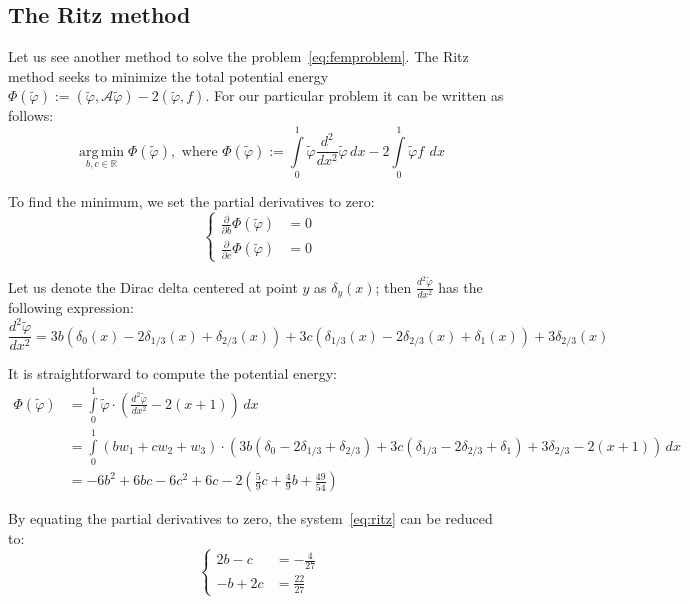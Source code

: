 \documentclass[notitlepage,oneside]{book}
\DeclareMathOperator*{\argmin}{arg\,min}
\begin{document}
\subsection{The Ritz method}
Let us see another method to solve the problem~\eqref{eq:femproblem}. 
The Ritz method seeks to minimize the total potential energy $\Phi(\tilde\varphi) := ( \tilde\varphi, \mathcal A \tilde\varphi) - 2 (\tilde\varphi, f)$.
For our particular problem it can be written as follows:
\begin{equation}
\label{eq:ritz}
\argmin\limits_{b,c\in \mathbb R} \Phi(\tilde\varphi), \text{~where~} \Phi(\tilde\varphi) :=  \int\limits_0^1 \tilde\varphi \frac{d^2}{dx^2}\tilde{\varphi}\, dx -2 \int\limits_0^1 \tilde\varphi f\ \, dx 
\end{equation}

To find the minimum, we set the partial derivatives to zero:
\begin{equation}
\label{eq:ritz}
\left\{
\begin{split}
\frac{\partial}{\partial b} \Phi(\tilde\varphi) & = 0 \\
\frac{\partial}{\partial c} \Phi(\tilde\varphi) & = 0
\end{split}
\right.
\end{equation}

Let us denote the Dirac delta centered at point $y$ as $\delta_y(x)$; then $\frac{d^2\tilde{\varphi}}{dx^2}$ has the following expression:
$$
\frac{d^2\tilde{\varphi}}{dx^2} = 3b(\delta_0(x) - 2\delta_{1/3}(x) + \delta_{2/3}(x)) + 3c(\delta_{1/3}(x) - 2\delta_{2/3}(x) + \delta_{1}(x)) + 3\delta_{2/3}(x)
$$

It is straightforward to compute the potential energy:
\begin{align*}
\Phi(\tilde\varphi) &= \int\limits_0^1 \tilde{\varphi} \cdot \left(\frac{d^2\tilde{\varphi}}{dx^2} - 2(x+1)\right)\,dx \\
&= \int\limits_0^1 (b w_1 + c w_2 + w_3 ) \cdot (3b(\delta_0 - 2\delta_{1/3} + \delta_{2/3}) + 3c(\delta_{1/3} - 2\delta_{2/3} + \delta_{1}) + 3\delta_{2/3} - 2(x+1))\,dx \\
&= -6b^2 + 6bc -6c^2 + 6c -2\left(\frac{5}{9}c + \frac{4}{9}b + \frac{49}{54}\right)
\end{align*}

By equating the partial derivatives to zero, the system~\ref{eq:ritz} can be reduced to:
$$
\left\{
\begin{split}
2b - c &= -\frac{4}{27}\\
-b + 2c &= \frac{22}{27}
\end{split}
\right.
$$
\end{document}
